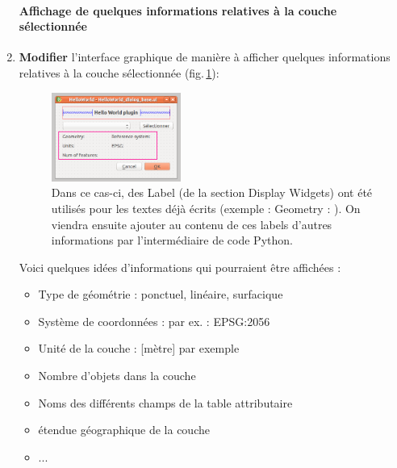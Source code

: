 \documentclass[11pt]{article}
\begin{document}
\begin{enumerate}
\paragraph*{Affichage de quelques informations relatives à la couche sélectionnée}

\item \textbf{Modifier} l'interface graphique de manière à afficher quelques informations relatives à la couche sélectionnée (fig.\,\ref{qt_labels}): 

\vspace*{-1.8em}
\begin{figure}[H]
    \centering
    \includegraphics[width=0.4\textwidth]{qt_labels.png}
    \vspace*{-0.4em}
    \caption[Ajout de \og{}Labels\fg{} à l'interface graphique]{Dans ce cas-ci, des \og{}Label\fg{} (de la section \og{}Display Widgets\fg{}) ont été utilisés pour les textes déjà écrits (exemple : \og{} Geometry : \fg{}). On viendra ensuite ajouter au contenu de ces labels d'autres informations par l'intermédiaire de code Python.}
    \label{qt_labels}
\end{figure}
\vspace*{-1em}


Voici quelques idées d'informations qui pourraient être affichées : 

\begin{itemize}\itemsep0.2em
\renewcommand\labelitemi{\---}
\item Type de géométrie : ponctuel, linéaire, surfacique
\item Système de coordonnées : par ex. : EPSG:2056
\item Unité de la couche : [mètre] par exemple 
\item Nombre d'objets dans la couche 
\item Noms des différents champs de la table attributaire 
\item étendue géographique de la couche
\item ...
\end{itemize}


\end{enumerate}
\end{document}
